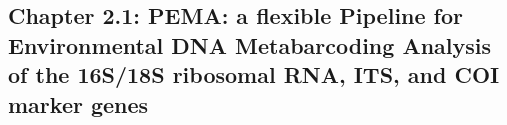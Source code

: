 \documentclass{beamer}
\begin{document}
   \begin{darkframes}
      \subsection{\textbf{Chapter 2.1}: PEMA: a flexible Pipeline for Environmental DNA Metabarcoding Analysis of the
      16S/18S ribosomal RNA, ITS, and COI marker genes}
   \end{darkframes}
   



         
         


\end{document}
